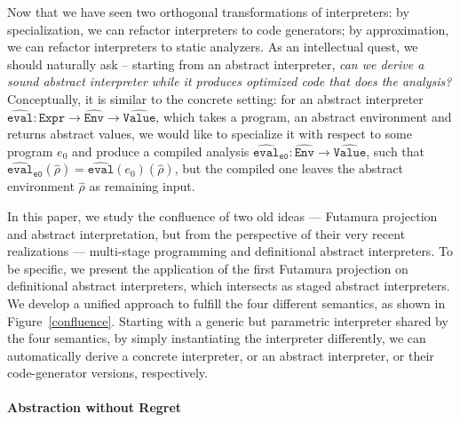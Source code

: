 Now that we have seen two orthogonal transformations of interpreters: by
specialization, we can refactor interpreters to code generators; by
approximation, we can refactor interpreters to static analyzers. As an
intellectual quest, we should naturally ask -- starting from an abstract
interpreter, \textit{can we derive a sound abstract interpreter while it
produces optimized code that does the analysis?}
Conceptually, it is similar to the concrete setting: for an
abstract interpreter $\widehat{\texttt{eval}}: \texttt{Expr} \to
\widehat{\texttt{Env}} \to \widehat{\texttt{Value}}$, which takes a program, an abstract
environment and returns abstract values, we would like to specialize it with
respect to some program $e_0$ and produce a compiled analysis
$\widehat{\texttt{eval}}_{\texttt{e0}} : \widehat{\texttt{Env}} \to
\widehat{\texttt{Value}}$, such that $
\widehat{\texttt{eval}}_{\texttt{e0}}(\widehat{\rho}) =
\widehat{\texttt{eval}}(e_0)(\widehat{\rho})$, but the compiled one leaves the
abstract environment $\widehat{\rho}$ as remaining input.

In this paper, we study the confluence of two old ideas --- Futamura projection
and abstract interpretation, but from the perspective of their very recent
realizations --- multi-stage programming and definitional abstract interpreters.
To be specific, we present the application of the first Futamura projection on
definitional abstract interpreters, which intersects as staged abstract
interpreters. We develop a unified approach to fulfill the four different
semantics, as shown in Figure~\ref{confluence}. Starting with a generic but
parametric interpreter shared by the four semantics, by simply instantiating
the interpreter differently, we can automatically derive a concrete interpreter,
or an abstract interpreter, or their code-generator versions, respectively.

\iffalse
embedded domain-specific languages \cite{DBLP:conf/snapl/RompfBLSJAOSKDK15,
DBLP:journals/jfp/CaretteKS09, DBLP:conf/icfp/GibbonsW14,
Hofer:2008:PED:1449913.1449935},
The key idea that enables this flexibility is to use abstract type members first
abstract over concrete/abstract components (e.g., concrete values or abstract
values), then as well as the binding-time of them (e.g., static or dynamic). By
staging, the overhead caused by the monadic layers is eliminated in the
generated code.
\fi

\paragraph{Abstraction without Regret}


